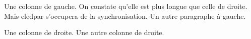 \begin{pairs}
  \begin{Leftside}
    \beginnumbering
    \pstart
    Une colonne de gauche.
    On constate qu'elle est plus longue que celle de droite.
    Mais eledpar s'occupera de la synchronisation.
    \pend
    \pstart
    Un autre paragraphe à gauche.
    \pend
    \endnumbering
  \end{Leftside}
  \begin{Rightside}
    \beginnumbering
    \pstart
    Une colonne de droite.
    \pend
    \pstart
    Une autre colonne de droite.
    \pend
    \endnumbering
  \end{Rightside}
\end{pairs}
\Columns
